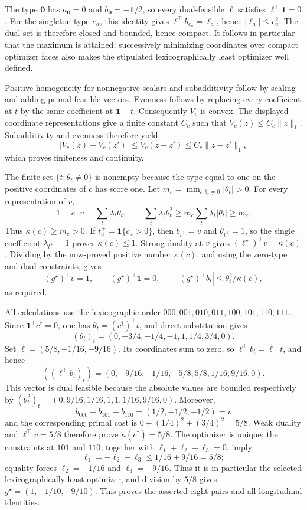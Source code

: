 The type \(\mathbf0\) has \(a_{\mathbf0}=0\) and \(b_{\mathbf0}=-\mathbf1/2\), so every dual-feasible \(\ell\) satisfies \(\ell^\top\mathbf1=0\).  For the singleton type \(e_a\), this identity gives \(\ell^\top b_{e_a}=\ell_a\), hence \(|\ell_a|\le c_a^2\).  The dual set is therefore closed and bounded, hence compact.  It follows in particular that the maximum is attained; successively minimizing coordinates over compact optimizer faces also makes the stipulated lexicographically least optimizer well defined.

Positive homogeneity for nonnegative scalars and subadditivity follow by scaling and adding primal feasible vectors.  Evenness follows by replacing every coefficient at \(t\) by the same coefficient at \(\mathbf1-t\).  Consequently \(V_c\) is convex.  The displayed coordinate representations give a finite constant \(C_c\) such that \(V_c(z)\le C_c\|z\|_1\).  Subadditivity and evenness therefore yield
\[
|V_c(z)-V_c(z')|\le V_c(z-z')\le C_c\|z-z'\|_1,
\]
which proves finiteness and continuity.

The finite set \(\{t:\theta_t\ne0\}\) is nonempty because the type equal to one on the positive coordinates of \(c\) has score one.  Let
\(m_c=\min_{t:\theta_t\ne0}|\theta_t|>0\).  For every representation of \(v\),
\[
1=c^\top v=\sum_t\lambda_t\theta_t,
\qquad
\sum_t\lambda_t\theta_t^2
 \ge m_c\sum_t\lambda_t|\theta_t|
 \ge m_c.
\]
Thus \(\kappa(c)\ge m_c>0\).  If \(t^+_a=\mathbf1\{c_a>0\}\), then \(b_{t^+}=v\) and \(\theta_{t^+}=1\), so the single coefficient \(\lambda_{t^+}=1\) proves \(\kappa(c)\le1\).  Strong duality at \(v\) gives \((\ell^\star)^\top v=\kappa(c)\).  Dividing by the now-proved positive number \(\kappa(c)\), and using the zero-type and dual constraints, gives
\[
(g^\star)^\top v=1,\qquad (g^\star)^\top\mathbf1=0,\qquad
|(g^\star)^\top b_t|\le\theta_t^2/\kappa(c),
\]
as required.

All calculations use the lexicographic order
\(000,001,010,011,100,101,110,111\).  Since \(\mathbf1^\top c^\dagger=0\), one has \(\theta_t=(c^\dagger)^\top t\), and direct substitution gives
\[
(\theta_t)_t=(0,-3/4,-1/4,-1,1,1/4,3/4,0).
\]
Set \(\ell=(5/8,-1/16,-9/16)\).  Its coordinates sum to zero, so \(\ell^\top b_t=\ell^\top t\), and hence
\[
((\ell^\top b_t)_t)=(0,-9/16,-1/16,-5/8,5/8,1/16,9/16,0).
\]
This vector is dual feasible because the absolute values are bounded respectively by
\((\theta_t^2)_t=(0,9/16,1/16,1,1,1/16,9/16,0)\).  Moreover,
\[
b_{000}+b_{101}+b_{110}=(1/2,-1/2,-1/2)=v
\]
and the corresponding primal cost is \(0+(1/4)^2+(3/4)^2=5/8\).  Weak duality and
\(\ell^\top v=5/8\) therefore prove \(\kappa(c^\dagger)=5/8\).  The optimizer is unique: the constraints at \(101\) and \(110\), together with \(\ell_1+\ell_2+\ell_3=0\), imply
\[
\ell_1=-\ell_2-\ell_3\le1/16+9/16=5/8;
\]
equality forces \(\ell_2=-1/16\) and \(\ell_3=-9/16\).  Thus it is in particular the selected lexicographically least optimizer, and division by \(5/8\) gives
\(g^\star=(1,-1/10,-9/10)\).  This proves the asserted eight pairs and all longitudinal identities.


